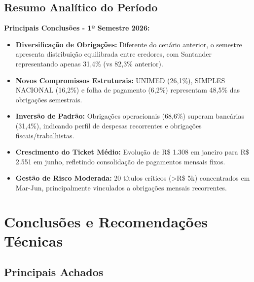 \documentclass[12pt, a4paper]{article}
\begin{document}
\subsection{Resumo Analítico do Período}

\textbf{Principais Conclusões - 1º Semestre 2026:}

\begin{itemize}
    \item \textbf{Diversificação de Obrigações:} Diferente do cenário anterior, o semestre apresenta distribuição equilibrada entre credores, com Santander representando apenas 31,4\% (vs 82,3\% anterior).

    \item \textbf{Novos Compromissos Estruturais:} UNIMED (26,1\%), SIMPLES NACIONAL (16,2\%) e folha de pagamento (6,2\%) representam 48,5\% das obrigações semestrais.

    \item \textbf{Inversão de Padrão:} Obrigações operacionais (68,6\%) superam bancárias (31,4\%), indicando perfil de despesas recorrentes e obrigações fiscais/trabalhistas.

    \item \textbf{Crescimento do Ticket Médio:} Evolução de R\$ 1.308 em janeiro para R\$ 2.551 em junho, refletindo consolidação de pagamentos mensais fixos.

    \item \textbf{Gestão de Risco Moderada:} 20 títulos críticos (>R\$ 5k) concentrados em Mar-Jun, principalmente vinculados a obrigações mensais recorrentes.
\end{itemize}

\newpage

\section{Conclusões e Recomendações Técnicas}

\subsection{Principais Achados}
\end{document}
